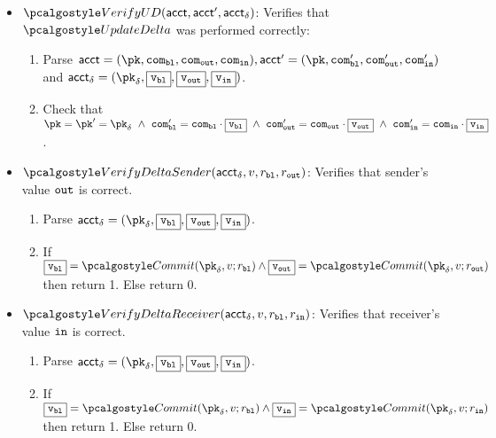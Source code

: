 \begin{itemize}
    \item $\verupddelta(\acct, \acct', \acct_{\delta})$: Verifies that $\upddelta$ was performed correctly:
    \begin{enumerate}
        \item Parse $\acct = (\pk, \com_{\varbl}, \com_{\varout}, \com_{\varin}), \acct' = (\pk, \com_{\varbl}^\prime, \com_{\varout}^\prime, \com_{\varin}^\prime)$ and $\acct_{\delta} = (\pk_{\delta}, \comm{\vbl}, \comm{\vout}, \comm{\vin})$.
        \item Check that $\pk = \pk' = \pk_{\delta} 
        \ \land \ \com_{\varbl}^\prime = \com_{\varbl} \cdot \comm{\vbl} 
        \ \land \ \com_{\varout}^\prime = \com_{\varout} \cdot \comm{\vout}
        \ \land \ \com_{\varin}^\prime = \com_{\varin} \cdot \comm{\vin}$.
    \end{enumerate}
    \vspace{0.3cm}

    \item $\versenderdelta(\acct_{\delta}, v, r_{\varbl}, r_{\varout})$: Verifies that sender's value $\textup{\texttt{{out}}}$ is correct.
    \begin{enumerate}
        \item Parse $\acct_{\delta} = (\pk_{\delta}, \comm{\vbl}, \comm{\vout}, \comm{\vin})$.
        \item If $\comm{\vbl} = \commit(\pk_{\delta}, v;r_{\varbl}) \land \comm{\vout} = \commit(\pk_{\delta},v;r_{\varout})$ then return 1. Else return 0.
    \end{enumerate}
    \vspace{0.3cm}

    \item $\verrecdelta(\acct_{\delta}, v, r_{\varbl}, r_{\varin})$: Verifies that receiver's value $\textup{\texttt{{in}}}$ is correct.
    \begin{enumerate}
        \item Parse $\acct_{\delta} = (\pk_{\delta}, \comm{\vbl}, \comm{\vout}, \comm{\vin})$.
        \item If $\comm{\vbl} = \commit(\pk_{\delta}, v;r_{\varbl}) \land \comm{\vin} = \commit(\pk_{\delta}, v;r_{\varin})$ then return 1. Else return 0.
    \end{enumerate}
    \vspace{0.3cm}

\end{itemize}

